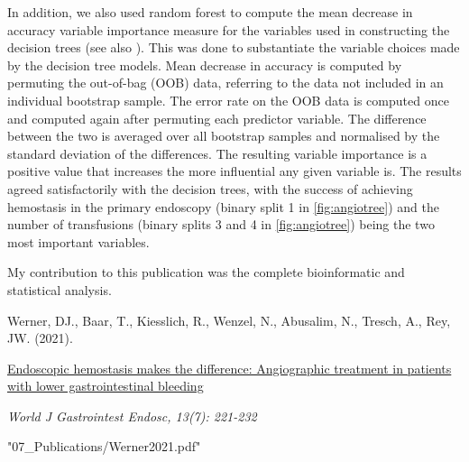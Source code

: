 \noindent
In addition, we also used random forest to compute the mean decrease in
accuracy variable importance measure for the variables used in constructing
the decision trees \citep{Han2016} (see also ). This
was done to substantiate the variable choices made by the decision tree
models. Mean decrease in accuracy is computed by permuting the out-of-bag (OOB)
data, referring to the data not included in an individual bootstrap sample.
The error rate on the OOB data is computed once and computed again after
permuting each predictor variable.  The difference between the two is averaged
over all bootstrap samples and normalised by the standard deviation of the
differences. The resulting variable importance is a positive value that
increases the more influential any given variable is. The results agreed
satisfactorily with the decision trees, with the success of achieving
hemostasis in the primary endoscopy (binary split 1 in \cref{fig:angiotree})
and the number of transfusions (binary splits 3 and 4 in \cref{fig:angiotree})
being the two most important variables.

\vfill
\noindent My contribution to this publication was the complete bioinformatic
and statistical analysis.\nopagebreak
\medskip
\begin{tcolorbox}[
  boxrule=0pt, leftrule=1pt, colframe=s-blue, colback=white, sharp corners=all]%
  \raggedright
  Werner, DJ., Baar, T., Kiesslich, R., Wenzel, N., Abusalim, N., Tresch, A.,
  Rey, JW. (2021).
  
  \smallskip
  \href{https://www.wjgnet.com/1948-5190/full/v13/i7/221.htm}
    {Endoscopic hemostasis makes the difference: Angiographic treatment in
    patients with lower gastrointestinal bleeding}

  \smallskip
  \textit{World J Gastrointest Endosc, 13(7): 221-232}
\end{tcolorbox}



  {"07_Publications/Werner2021.pdf"}

\null
\thispagestyle{empty}
\newpage